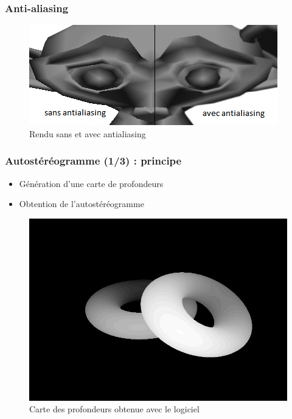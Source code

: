\documentclass{beamer}
\begin{document}
\begin{frame}
\frametitle{Anti-aliasing}
\begin{figure}
\centering
\includegraphics[scale=0.8]{antialiasing.png}
\caption{Rendu sans et avec antialiasing}
\end{figure}

\end{frame}


\begin{frame}
\frametitle{Autostéréogramme (1/3) : principe}

\begin{itemize}[label=$\bullet$]
\item Génération d'une carte de profondeurs
\item Obtention de l'autostéréogramme
\end{itemize}

\begin{figure}
\centering
\includegraphics[scale=0.22]{donutdepth.png}
\caption{Carte des profondeurs obtenue avec le logiciel}
\end{figure}
\end{frame}
\end{document}
